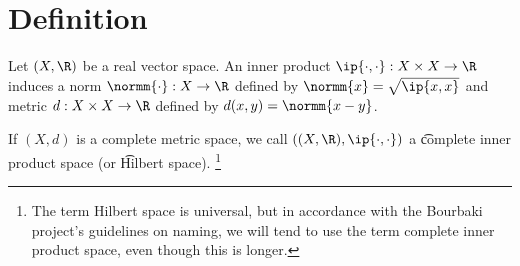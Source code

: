 
\section*{Definition}

Let $(X, \R )$ be a real vector space. An inner product $\ip{\cdot ,\cdot }: X\times  X \to \R $ induces a norm $\normm{\cdot }: X \to \R $ defined by $\normm{x} = \sqrt{\ip{x,x}}$ and metric $d: X \times  X \to \R $ defined by $d(x, y) = \normm{x - y}$.

If $(X, d)$ is a complete metric space, we call $((X, \R ), \ip{\cdot ,\cdot })$ a \t{complete inner product space} (or \t{Hilbert space}).
  \ifhmode\unskip\fi\footnote{
The term Hilbert space is universal, but in accordance with the Bourbaki project's guidelines on naming, we will tend to use the term complete inner product space, even though this is longer.
  }

\blankpage

